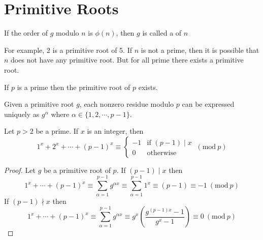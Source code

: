 \documentclass[11pt,numbers=noenddot,svgnames,dvipsnames]{scrartcl}
\renewcommand{\pmod}[1]{\ (\mathrm{mod}\ #1)}
\begin{document}
\section{Primitive Roots}

\begin{definition}
    If the order of $g$ modulo $n$ is $\phi(n)$, then $g$ is called 
    a  of $n$
\end{definition}
For example, 2 is a primitive root of 5. 
If $n$ is not a prime, then it is possible that $n$ does not have any primitive root. 
But for all prime there exists a primitive root.

\begin{theorem}
    If $p$ is a prime then the primitive root of $p$ exists. 
\end{theorem}
\begin{lemma}
    Given a primitive root $g$, each nonzero residue modulo $p$ can be 
    expressed uniquely as $g^{\alpha}$ where $\alpha \in \{1, 2, \cdots, p - 1\}$.
\end{lemma}

\begin{lemma}
    Let $p > 2$ be a prime. If $x$ is an integer, then 
    \begin{equation*}
        1^{x} + 2^{x} + \cdots + (p - 1)^{x} \equiv 
        \begin{cases}
            -1 &\text{if }(p - 1) \mid x \\
             0 &\text{otherwise}
        \end{cases}
        \pmod p
    \end{equation*}
\end{lemma}
\begin{proof}
    Let $g$ be a primitive root of $p$. 
    If $(p - 1)\mid x$ then 
    \[
        1^{x} + \cdots + (p - 1)^{x} 
        \equiv \sum_{\alpha = 1}^{p - 1} g^{\alpha x} 
        \equiv \sum_{\alpha = 1}^{p - 1} 1^{x} 
        \equiv (p - 1) \equiv -1 \pmod p
    \]
    If $(p - 1)\nmid x$ then 
    \[
        1^{x} + \cdots + (p - 1)^{x} 
        \equiv \sum_{\alpha = 1}^{p-1} g^{\alpha x} 
        \equiv g^{x}\left(\frac{g^{(p - 1)x} - 1}{g^{x} - 1}\right) 
        \equiv 0 \pmod p
    \]
\end{proof}
\end{document}
